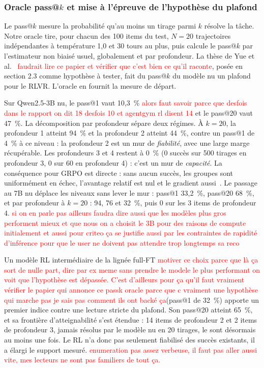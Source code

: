 \documentclass[11pt,a4paper]{article}
\begin{document}
\subsubsection{Oracle pass@$k$ et mise à l'épreuve de l'hypothèse du plafond}

Le pass@$k$ mesure la probabilité qu'au moins un tirage parmi $k$ résolve la tâche. Notre oracle tire, pour chacun des 100 items du test, $N=20$ trajectoires indépendantes à température 1{,}0 et 30 tours au plus, puis calcule le pass@$k$ par l'estimateur non biaisé usuel, globalement et par profondeur. La thèse de Yue et al.~\cite{yue2025rlvr} \textcolor{red}{faudrait lire ce papier et vérifier que c'est bien ce qu'il raconte}, posée en section 2.3 comme hypothèse à tester, fait du pass@$k$ du modèle nu un plafond pour le RLVR. L'oracle en fournit la mesure de départ.

Sur Qwen2.5-3B nu, le pass@1 vaut 10{,}3~\% \textcolor{red}{alors faut savoir parce que desfois dans le rapport on dit 18 desfois 10 et agentgym rl disent 14} et le pass@20 vaut 47~\%. La décomposition par profondeur sépare deux régimes. À $k=20$, la profondeur 1 atteint 94~\% et la profondeur 2 atteint 44~\%, contre un pass@1 de 4~\% à ce niveau : la profondeur 2 est un mur de \emph{fiabilité}, avec une large marge récupérable. Les profondeurs 3 et 4 restent à 0~\% (0 succès sur 500 tirages en profondeur 3, 0 sur 60 en profondeur 4) : c'est un mur de \emph{capacité}. La conséquence pour GRPO est directe : sans aucun succès, les groupes sont uniformément en échec, l'avantage relatif est nul et le gradient aussi~\cite{liu2025drgrpo}. Le passage au 7B nu déplace les niveaux sans lever le mur : pass@1 33{,}2~\%, pass@20 68~\%, et par profondeur à $k=20$ : 94, 76 et 32~\%, puis 0 sur les 3 items de profondeur 4. \textcolor{red}{si on en parle pas ailleurs faudra dire aussi que les modèles plus gros performent mieux et que nous on a choisit le 3B pour des raisons de compute initialement et aussi pour criteo ça se justifie aussi par les contraintes de rapidité d'inférence pour que le user ne doivent pas attendre trop longtemps sa reco}

Un modèle RL intermédiaire de la lignée full-FT \textcolor{red}{motiver ce choix parce que là ça sort de nulle part, dire par ex meme sans prendre le modele le plus performant on voit que l'hypothèse est dépassée. C'est d'ailleurs pour ça qu'il faut vraiment vérifier le papier qui annonce ce passk oracle parce que c vraiment une hypothèse qui marche pas je sais pas comment ils ont backé ça}(pass@1 de 32~\%) apporte un premier indice contre une lecture stricte du plafond. Son pass@20 atteint 65~\%, et sa frontière d'atteignabilité s'est étendue : 14 items de profondeur 2 et 2 items de profondeur 3, jamais résolus par le modèle nu en 20 tirages, le sont désormais au moins une fois. Le RL n'a donc pas seulement fiabilisé des succès existants, il a élargi le support mesuré. \textcolor{red}{enumeration pas assez verbeuse, il faut pas aller aussi vite, mes lecteurs ne sont pas familiers de tout ça.}
\end{document}
